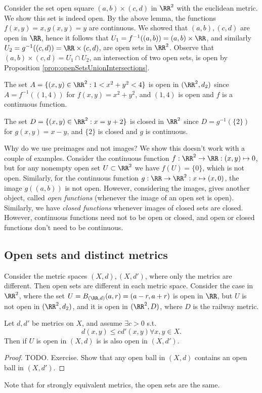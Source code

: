 \begin{example}
  Consider the set open square $(a,b)\times(c,d)$ in $\RR^2$ with the euclidean
  metric. We show this set is indeed open.  By the above lemma, the functions
  $f(x,y)=x, g(x,y)=y$ are continuous. We showed that $(a,b),(c,d)$ are open in
  $\RR$, hence it follows that $U_1=f^{-1}( (a,b))=(a,b)\times\RR$, and similarly
  $U_2=g^{-1}( (c,d))=\RR\times (c,d)$, are open sets in $\RR^2$. Observe that
  $(a,b)\times(c,d)=U_1\cap U_2$, an intersection of two open sets, is open by
  Proposition \ref{prop:openSetsUnionIntersections}.
\end{example}
\begin{example}
  The set $A=\{(x,y)\in\RR^2 : 1<x^2+y^2<4\}$ is open in $(\RR^2, d_2)$ since
  $A= f^{-1}( (1,4))$ for $f(x,y)=x^2+y^2$, and $(1,4)$ is open and $f$ is a
  continuous function.

  The set $D=\{(x,y)\in\RR^2 : x=y+2\}$ is closed in $\RR^2$ since
  $D=g^{-1}(\{2\})$ for $g(x,y)=x-y$, and $\{2\}$ is closed and $g$ is
  continuous.
\end{example}

\begin{remark}
  Why do we use preimages and not images? We show this doesn't work with a
  couple of examples. Consider the continuous function
  $f:\RR^2\to\RR:(x,y)\mapsto 0$, but for any nonempty open set $U\subset\RR^2$
  we have $f(U)=\{0\}$, which is not open. Similarly, for the continuous
  function $g:\RR\to\RR^2:x\mapsto(x,0)$, the image $g( (a,b))$ is not open.
  However, considering the images, gives another object, called \emph{open
  functions} (whenever the image of an open set is open). Similarly, we have
  \emph{closed functions} whenever images of closed sets are closed. However,
  continuous functions need not to be open or closed, and open or closed
  functions don't need to be continuous.
  \label{<+label+>}
\end{remark}


\subsection{Open sets and distinct metrics}
Consider the metric spaces $(X,d),(X,d')$, where only the metrics are different.
Then open sets are different in each metric space. Consider the case in $\RR^2$,
where the set $U=B_{(\RR,d)}(a,r)=(a-r,a+r)$ is open in $\RR$, but $U$ is not
open in $(\RR^2,d_2)$, and it is open in $(\RR^2, D)$, where $D$ is the railway
metric.
\begin{proposition}
  Let $d,d'$ be metrics on $X$, and assume $\exists c>0$ s.t. 
  \[d(x,y)\leq cd'(x,y) \forall x,y\in X.\]
  Then if $U$ is open in $(X,d)$ is is also open in $(X,d')$.
  \label{prop:equivalenceAndOpenSets}
\end{proposition}
\begin{proof}
  TODO. Exercise. Show that any open ball in $(X,d)$ contains an open ball in
  $(X,d')$.
\end{proof}
Note that for strongly equivalent metrics, the open sets are the same.
